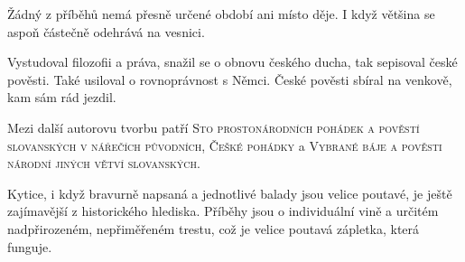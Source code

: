 \documentclass{extarticle} %
\begin{document}
\noindent 
Žádný z příběhů nemá přesně určené období ani místo děje. I když většina se aspoň částečně odehrává na vesnici.







\noindent 
Vystudoval filozofii a práva, snažil se o obnovu českého ducha, tak sepisoval české pověsti. Také usiloval o rovnoprávnost s Němci. České pověsti sbíral na venkově, kam sám rád jezdil.


\noindent Mezi další autorovu tvorbu patří \textsc{Sto prostonárodních pohádek a pověstí slovanských v nářečích původních}, \textsc{Češké pohádky} a \textsc{Vybrané báje a pověsti národní jiných větví slovanských}.






\noindent 
Kytice, i když bravurně napsaná a jednotlivé balady jsou velice poutavé, je ještě zajímavější z historického hlediska. Příběhy jsou o individuální vině a určitém nadpřirozeném, nepřiměřeném trestu, což je velice poutavá zápletka, která funguje.

\vfill
\end{document}
